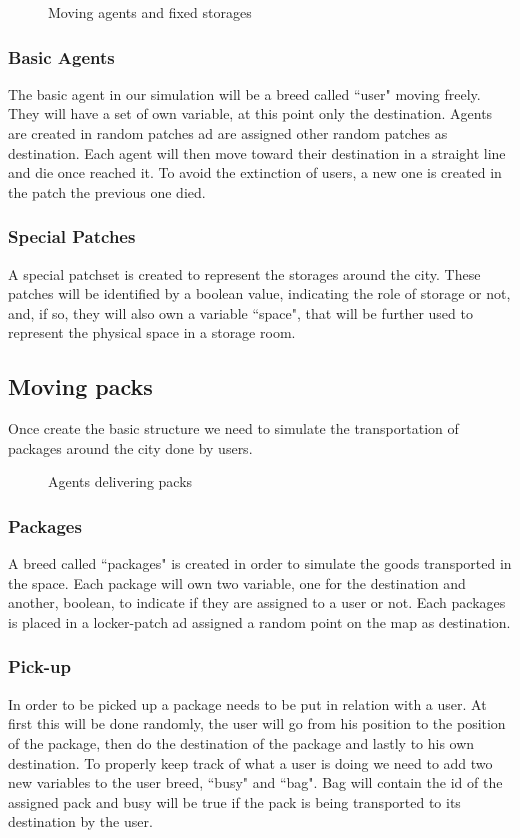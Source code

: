 \documentclass[11pt,a4paper]{article}
\begin{document}
\begin{figure}[h!]
\centering
%
%
%
%
%
%
%
%
%
%
%
%
%
%
%
%
%
%
%
%
\caption{Moving agents and fixed storages}
\end{figure}

\subsubsection*{Basic Agents}
The basic agent in our simulation will be a breed called “user" moving freely.
They will have a set of own variable, at this point only the destination.
Agents are created in random patches ad are assigned other random patches as destination.
Each agent will then move toward their destination in a straight line and die once reached it.
To avoid the extinction of users, a new one is created in the patch the previous one died.

\subsubsection*{Special Patches}
A special patchset is created to represent the storages around the city.
These patches will be identified by a boolean value, indicating the role of storage or not, and, if so, they will also own a variable “space", that will be further used to represent the physical space in a storage room.

\newpage
\subsection{Moving packs}
Once create the basic structure we need to simulate the transportation of packages around the city done by users.
\medskip
\begin{figure}[h!]
\centering
\caption{Agents delivering packs}
\end{figure}
\medskip
\subsubsection*{Packages}
A breed called “packages" is created in order to simulate the goods transported in the space. Each package will own two variable, one for the destination and another, boolean, to indicate if they are assigned to a user or not.
Each packages is placed in a locker-patch ad assigned a random point on the map as destination.

\medskip
\subsubsection*{Pick-up}
In order to be picked up a package needs to be put in relation with a user.
At first this will be done randomly, the user will go from his position to the position of the package, then do the destination of the package and lastly to his own destination.
To properly keep track of what a user is doing we need to add two new variables to the user breed, “busy" and “bag". Bag will contain the id of the assigned pack and busy will be true if the pack is being transported to its destination by the user.
\end{document}
